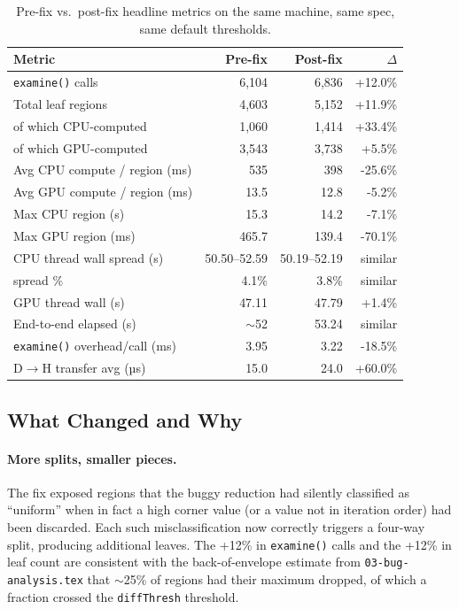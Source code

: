 \documentclass[
	english,
	letterpaper, oneside
]{article}
\begin{document}
\begin{table}[H]
    \centering
    \caption{Pre-fix vs.\ post-fix headline metrics on the same machine,
             same spec, same default thresholds.}
    \label{tab:compare}
    \begin{tabular}{lrrr}
        \hline
        Metric & Pre-fix & Post-fix & $\Delta$ \\
        \hline
        \texttt{examine()} calls         & 6{,}104   & 6{,}836   & +12.0\% \\
        Total leaf regions                & 4{,}603   & 5{,}152   & +11.9\% \\
        \quad of which CPU-computed       & 1{,}060   & 1{,}414   & +33.4\% \\
        \quad of which GPU-computed       & 3{,}543   & 3{,}738   & +5.5\% \\
        Avg CPU compute / region (ms)    & 535       & 398       & -25.6\% \\
        Avg GPU compute / region (ms)    & 13.5      & 12.8      & -5.2\% \\
        Max CPU region (s)                & 15.3      & 14.2      & -7.1\% \\
        Max GPU region (ms)              & 465.7     & 139.4     & -70.1\% \\
        CPU thread wall spread (s)       & 50.50--52.59 & 50.19--52.19 & similar \\
        \quad spread \%                   & 4.1\%     & 3.8\%     & similar \\
        GPU thread wall (s)               & 47.11     & 47.79     & +1.4\% \\
        End-to-end elapsed (s)            & $\sim$52  & 53.24     & similar \\
        \texttt{examine()} overhead/call (ms) & 3.95 & 3.22  & -18.5\% \\
        D$\rightarrow$H transfer avg (µs) & 15.0     & 24.0      & +60.0\% \\
        \hline
    \end{tabular}
\end{table}

\subsection{What Changed and Why}

\paragraph{More splits, smaller pieces.} The fix exposed regions that the
buggy reduction had silently classified as ``uniform'' when in fact a
high corner value (or a value not in iteration order) had been
discarded. Each such misclassification now correctly triggers a four-way
split, producing additional leaves. The +12\% in \texttt{examine()}
calls and the +12\% in leaf count are consistent with the back-of-envelope
estimate from \texttt{03-bug-analysis.tex} that $\sim$25\% of regions had
their maximum dropped, of which a fraction crossed the
\texttt{diffThresh} threshold.
\end{document}
